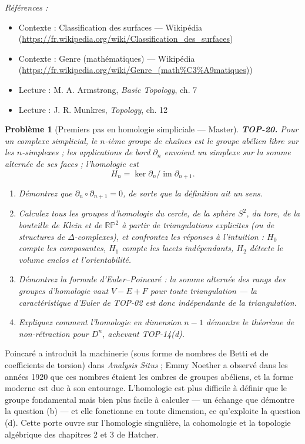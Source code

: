 \documentclass[11pt]{article}
\newtheorem{problem}{Problème}
\newenvironment{refs}{\par\small\noindent\emph{Références :}\begin{itemize}\setlength\itemsep{0pt}}{\end{itemize}\normalsize}
\begin{document}
\begin{refs}
\item Contexte : Classification des surfaces --- Wikipédia (\url{https://fr.wikipedia.org/wiki/Classification_des_surfaces})
\item Contexte : Genre (mathématiques) --- Wikipédia (\url{https://fr.wikipedia.org/wiki/Genre_(math%C3%A9matiques)})
\item Lecture : M. A. Armstrong, \textit{Basic Topology}, ch. 7
\item Lecture : J. R. Munkres, \textit{Topology}, ch. 12
\end{refs}

\bigskip

\begin{problem}[{Premiers pas en homologie simpliciale --- Master}]
\textbf{TOP-20.} Pour un complexe simplicial, le $ n $-ième groupe de chaînes est le groupe
abélien libre sur les $ n $-simplexes ; les applications de bord $ \partial_n $ envoient un simplexe
sur la somme alternée de ses faces ; l'homologie est
\[ H_n = \ker \partial_n / \operatorname{im} \partial_{n+1} . \]
\begin{enumerate}
\item[(a)] Démontrez que $ \partial_{n} \circ \partial_{n+1} = 0 $, de sorte que la définition ait un
sens.
\item[(b)] Calculez tous les groupes d'homologie du cercle, de la sphère $ S^2 $, du tore, de la bouteille
de Klein et de $ \mathbb{RP}^2 $ à partir de triangulations explicites (ou de structures de
$\Delta$-complexes), et confrontez les réponses à l'intuition : $ H_0 $ compte les composantes, $ H_1 $
compte les lacets indépendants, $ H_2 $ détecte le volume enclos et l'orientabilité.
\item[(c)] Démontrez la formule d'Euler--Poincaré : la somme alternée des rangs des groupes d'homologie vaut
$ V - E + F $ pour toute triangulation --- la caractéristique d'Euler de TOP-02 est donc indépendante
de la triangulation.
\item[(d)] Expliquez comment l'homologie en dimension $ n - 1 $ démontre le théorème de non-rétraction pour
$ D^n $, achevant TOP-14(d).
\end{enumerate}

\end{problem}

\noindent Poincaré a introduit la machinerie (sous forme de nombres de Betti et de coefficients
de torsion) dans \textit{Analysis Situs} ; Emmy Noether a observé dans les années 1920 que ces nombres
étaient les ombres de groupes abéliens, et la forme moderne est due à son entourage. L'homologie est plus
difficile à définir que le groupe fondamental mais bien plus facile à calculer --- un échange que démontre la
question (b) --- et elle fonctionne en toute dimension, ce qu'exploite la question (d). Cette porte ouvre
sur l'homologie singulière, la cohomologie et la topologie algébrique des chapitres 2 et 3 de
Hatcher.
\end{document}

